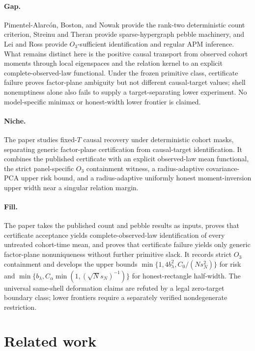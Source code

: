\documentclass{article}
\begin{document}
\paragraph{Gap.} Pimentel-Alarcón, Boston, and Nowak provide the rank-two deterministic count criterion, Streinu and Theran provide sparse-hypergraph pebble machinery, and Lei and Ross provide \(O_3\)-sufficient identification and regular APM inference. What remains distinct here is the positive causal transport from observed cohort moments through local eigenspaces and the relation kernel to an explicit complete-observed-law functional. Under the frozen primitive class, certificate failure proves factor-plane ambiguity but not different causal-target values; shell nonemptiness alone also fails to supply a target-separating lower experiment. No model-specific minimax or honest-width lower frontier is claimed.

\paragraph{Niche.} The paper studies fixed-\(T\) causal recovery under deterministic cohort masks, separating generic factor-plane certification from causal-target identification. It combines the published certificate with an explicit observed-law mean functional, the strict panel-specific \(O_3\) containment witness, a radius-adaptive covariance-PCA upper risk bound, and a radius-adaptive uniformly honest moment-inversion upper width near a singular relation margin.

\paragraph{Fill.} The paper takes the published count and pebble results as inputs, proves that certificate acceptance yields complete-observed-law identification of every untreated cohort-time mean, and proves that certificate failure yields only generic factor-plane nonuniqueness without further primitive slack. It records strict \(O_3\) containment and develops the upper bounds \(\min\{1,4b_\lambda^2,C_0/(Ns_N^2)\}\) for risk and \(\min\{b_\lambda,C_\alpha\min(1,(\sqrt N s_N)^{-1})\}\) for honest-rectangle half-width. The universal same-shell deformation claims are refuted by a legal zero-target boundary class; lower frontiers require a separately verified nondegenerate restriction.

\section{Related work}
\end{document}
